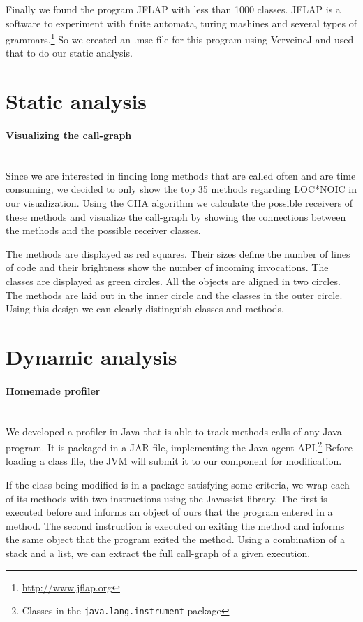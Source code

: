 \documentclass{paper}
\begin{document}
Finally we found the program JFLAP with less than 1000 classes. JFLAP is a software to experiment with finite automata, turing mashines and several types of grammars.\footnote{\url{http://www.jflap.org}} So we created an .mse file for this program using VerveineJ and used that to do our static analysis.


\section{Static analysis}

\paragraph{Visualizing the call-graph}\mbox{}\vspace{10pt}\\
Since we are interested in finding long methods that are called often and are time consuming, we decided to only show the top 35 methods regarding LOC*NOIC in our visualization. Using the CHA algorithm we calculate the possible receivers of these methods and visualize the call-graph by showing the connections between the methods and the possible receiver classes.


The methods are displayed as red squares. Their sizes define the number of lines of code and their brightness show the number of incoming invocations. The classes are displayed as green circles. All the objects are aligned in two circles. The methods are laid out in the inner circle and the classes in the outer circle. Using this design we can clearly distinguish classes and methods.

\section{Dynamic analysis}

\paragraph{Homemade profiler}\mbox{}\vspace{10pt}\\
We developed a profiler in Java that is able to track methods calls of any Java program. It is packaged in a JAR file, implementing the Java agent API.\footnote{Classes in the \texttt{java.lang.instrument} package} Before loading a class file, the JVM will submit it to our component for modification.


If the class being modified is in a package satisfying some criteria,  we wrap each of its methods with two instructions using the Javassist library. The first is executed before and informs an object of ours that the program entered in a method. The second instruction is executed on exiting the method and informs the same object that the program exited the method. Using a combination of a stack and a list, we can extract the full call-graph of a given execution.
\end{document}
